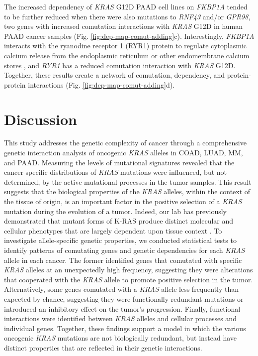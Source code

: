 \documentclass[english, 10pt, letterpaper]{article}
\newcommand{\KRAS}{\emph{KRAS}}
\newcommand{\kras}{K-RAS}
\begin{document}
The increased dependency of \KRAS{} G12D PAAD cell lines on \emph{FKBP1A} tended to be further reduced when there were also mutations to \emph{RNF43} and/or \emph{GPR98}, two genes with increased comutation interactions with \KRAS{} G12D in human PAAD cancer samples (Fig. \ref{fig:dep-map-comut-adding}c).
Interestingly, \emph{FKBP1A} interacts with the ryanodine receptor 1 (RYR1) protein to regulate cytoplasmic calcium release from the endoplasmic reticulum or other endomembrane calcium stores \cite{Jayaraman1992FK506Receptor, Fill2002RyanodineChannels.}, and \emph{RYR1} has a reduced comutation interaction with \KRAS{} G12D.
Together, these results create a network of comutation, dependency, and protein-protein interactions (Fig. \ref{fig:dep-map-comut-adding}d).


\section*{Discussion}

This study addresses the genetic complexity of cancer through a comprehensive genetic interaction analysis of oncogenic \KRAS{} alleles in COAD, LUAD, MM, and PAAD. 
Measuring the levels of mutational signatures revealed that the cancer-specific distributions of \KRAS{} mutations were influenced, but not determined, by the active mutational processes in the tumor samples.
This result suggests that the biological properties of the \KRAS{} alleles, within the context of the tissue of origin, is an important factor in the positive selection of a \KRAS{} mutation during the evolution of a tumor.
Indeed, our lab has previously demonstrated that mutant forms of \kras{} produce distinct molecular and cellular phenotypes that are largely dependent upon tissue context \cite{Poulin2019, Brubaker2019, Johnson2019}. 
To investigate allele-specific genetic properties, we conducted statistical tests to identify patterns of comutating genes and genetic dependencies for each \KRAS{} allele in each cancer.
The former identified genes that comutated with specific \KRAS{} alleles at an unexpectedly high frequency, suggesting they were alterations that cooperated with the \KRAS{} allele to promote positive selection in the tumor.
Alternatively, some genes comutated with a \KRAS{} allele less frequently than expected by chance, suggesting they were functionally redundant mutations or introduced an inhibitory effect on the tumor's progression.
Finally, functional interactions were identified between \KRAS{} alleles and cellular processes and individual genes.
Together, these findings support a model in which the various oncogenic \KRAS{} mutations are not biologically redundant, but instead have distinct properties that are reflected in their genetic interactions.
\end{document}
